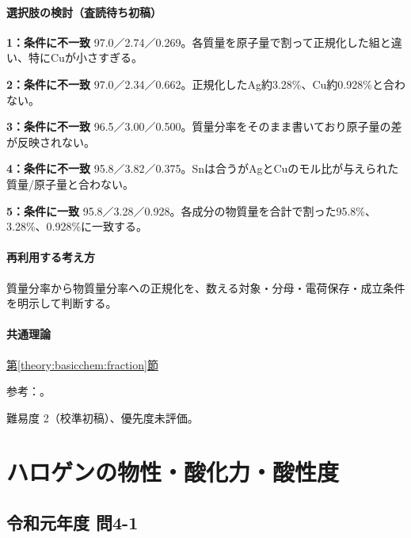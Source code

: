 \paragraph{選択肢の検討（査読待ち初稿）}\mbox{}\par

\noindent\textbf{1：条件に不一致} 97.0／2.74／0.269。各質量を原子量で割って正規化した組と違い、特にCuが小さすぎる。\par

\noindent\textbf{2：条件に不一致} 97.0／2.34／0.662。正規化したAg約3.28\%、Cu約0.928\%と合わない。\par

\noindent\textbf{3：条件に不一致} 96.5／3.00／0.500。質量分率をそのまま書いており原子量の差が反映されない。\par

\noindent\textbf{4：条件に不一致} 95.8／3.82／0.375。Snは合うがAgとCuのモル比が与えられた質量/原子量と合わない。\par

\noindent\textbf{5：条件に一致} 95.8／3.28／0.928。各成分の物質量を合計で割った95.8\%、3.28\%、0.928\%に一致する。\par

\paragraph{再利用する考え方} 質量分率から物質量分率への正規化を、数える対象・分母・電荷保存・成立条件を明示して判断する。

\paragraph{共通理論} \hyperref[theory:basicchem:fraction]{第\ref*{theory:basicchem:fraction}節}

\par 参考：\cite{iupac_amount_fraction}。

\par 難易度 2（校準初稿）、優先度未評価。

\section{ハロゲンの物性・酸化力・酸性度}

\subsection{令和元年度 問4-1}
\label{q:r01-reg-basic-4-1}

